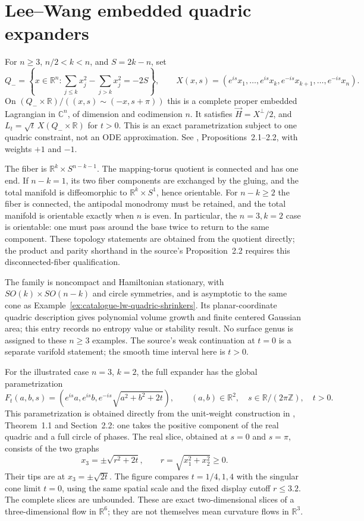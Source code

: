 \chapter{Lee--Wang embedded quadric expanders}\label{sec:catalogue-lw-quadric-expanders}
\begin{example}\label{ex:catalogue-lw-quadric-expanders}
For $n\geq3$, $n/2<k<n$, and $S=2k-n$, set
\[
 Q_-=\left\{x\in\mathbb R^n:\sum_{j\leq k}x_j^2-\sum_{j>k}x_j^2=-2S\right\},\qquad
 X(x,s)=(e^{is}x_1,\ldots,e^{is}x_k,e^{-is}x_{k+1},\ldots,e^{-is}x_n).
\]
On $(Q_-\times\mathbb R)/((x,s)\sim(-x,s+\pi))$ this is a complete proper embedded Lagrangian in $\mathbb C^n$, of dimension and codimension $n$. It satisfies $\vec H=X^\perp/2$, and $L_t=\sqrt t\,X(Q_-\times\mathbb R)$ for $t>0$. This is an exact parametrization subject to one quadric constraint, not an ODE approximation. See \cite{CatLeeWang2010}, Propositions~2.1--2.2, with weights $+1$ and $-1$.

The fiber is $\mathbb R^k\times S^{n-k-1}$. The mapping-torus quotient is connected and has one end. If $n-k=1$, its two fiber components are exchanged by the gluing, and the total manifold is diffeomorphic to $\mathbb R^k\times S^1$, hence orientable. For $n-k\geq2$ the fiber is connected, the antipodal monodromy must be retained, and the total manifold is orientable exactly when $n$ is even. In particular, the $n=3,k=2$ case is orientable: one must pass around the base twice to return to the same component. These topology statements are obtained from the quotient directly; the product and parity shorthand in the source's Proposition~2.2 requires this disconnected-fiber qualification.

The family is noncompact and Hamiltonian stationary, with $SO(k)\times SO(n-k)$ and circle symmetries, and is asymptotic to the same cone as Example~\ref{ex:catalogue-lw-quadric-shrinkers}. Its planar-coordinate quadric description gives polynomial volume growth and finite centered Gaussian area; this entry records no entropy value or stability result. No surface genus is assigned to these $n\geq3$ examples. The source's weak continuation at $t=0$ is a separate varifold statement; the smooth time interval here is $t>0$.

For the illustrated case $n=3$, $k=2$, the full expander has the global parametrization
\[
 F_t(a,b,s)=\left(e^{is}a,e^{is}b,e^{-is}\sqrt{a^2+b^2+2t}\right),
 \qquad (a,b)\in\mathbb R^2,\quad s\in\mathbb R/(2\pi\mathbb Z),\quad t>0.
\]
This parametrization is obtained directly from the unit-weight construction in \cite{CatLeeWang2010}, Theorem~1.1 and Section~2.2: one takes the positive component of the real quadric and a full circle of phases. The real slice, obtained at $s=0$ and $s=\pi$, consists of the two graphs
\[
 x_3=\pm\sqrt{r^2+2t},\qquad r=\sqrt{x_1^2+x_2^2}\geq0.
\]
Their tips are at $x_3=\pm\sqrt{2t}$. The figure compares $t=1/4,1,4$ with the singular cone limit $t=0$, using the same spatial scale and the fixed display cutoff $r\leq3.2$. The complete slices are unbounded. These are exact two-dimensional slices of a three-dimensional flow in $\mathbb R^6$; they are not themselves mean curvature flows in $\mathbb R^3$.


\end{example}
